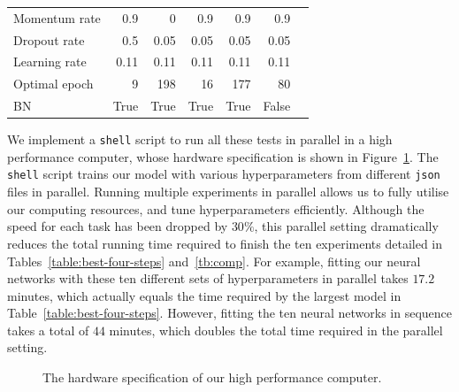 \begin{table}
{\begin{tabular}{@{}lrrrrrr@{}}
Momentum rate                & 0.9        & 0            & 0.9      & 0.9    & 0.9         \\
Dropout rate                & 0.5        & 0.05         & 0.05     & 0.05    & 0.05        \\
Learning rate                & 0.11       & 0.11         & 0.11     & 0.11    & 0.11       \\
Optimal epoch       & 9          & 198          & 16       & 177     & 80       \\ 
BN       & True          & True          & True       & True     & False       \\ \bottomrule
\end{tabular}
}
\end{table}

We implement a \texttt{shell} script to run all these tests in parallel in a high performance computer, whose hardware specification is shown in Figure~\ref{fig:hardware}. The \texttt{shell} script trains our model with various hyperparameters from different 
\texttt{json} files in parallel. 
Running multiple experiments in parallel allows us to fully utilise our computing resources, and tune hyperparameters efficiently. Although the speed for each task has been dropped by $30\%$, this parallel setting dramatically reduces the total running time required to finish the ten experiments detailed in Tables~\ref{table:best-four-steps} and~\ref{tb:comp}. For example, fitting our neural networks with these ten different sets of hyperparameters in parallel takes $17.2$ minutes, which actually equals the time required by the largest model in  Table~\ref{table:best-four-steps}. However, fitting the ten neural networks in sequence takes a total of $44$ minutes, which doubles the total time required in the parallel setting.
\begin{figure}
    \caption{The hardware specification of our high performance computer.}
    \label{fig:hardware}
\end{figure}
